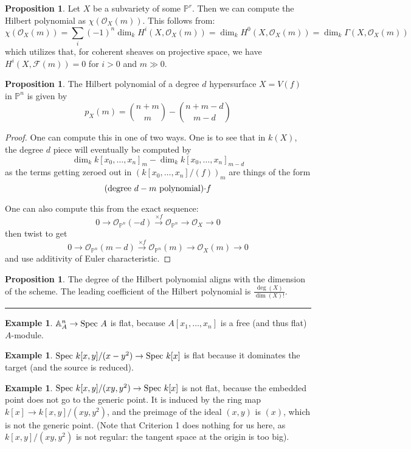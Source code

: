 \documentclass[10pt,reqno]{amsart}
\theoremstyle{definition}
\newtheorem{example}[theorem]{Example}
\newtheorem{proposition}[theorem]{Proposition}
\theoremstyle{remark}
\numberwithin{equation}{section}
\numberwithin{theorem}{section}
\newcommand{\OO}{{\mathcal O}}
\newcommand{\spec}{\textup{Spec }}
\newcommand{\FF}{{\mathscr F}}
\newcommand{\A}{{\mathbb A}}
\newcommand{\PP}{{\mathbb P}}
\begin{document}
\begin{proposition} Let $X$ be a subvariety of some $\PP^r$. Then we can compute the Hilbert polynomial as $\chi(\OO_X(m))$. This follows from:
\[\chi(\OO_X(m)) = \sum_{i} (-1)^n \dim_k H^i(X,\OO_X(m)) = \dim_k H^0(X,\OO_X(m)) = \dim_k \Gamma(X,\OO_X(m))\]
which utilizes that, for coherent sheaves on projective space, we have $H^i(X,\FF(m)) = 0$ for $i > 0$ and $m \gg 0$.
\end{proposition}

\begin{proposition} The Hilbert polynomial of a degree $d$ hypersurface $X = V(f)$ in $\PP^n$ is given by
\[p_X(m) = \binom{n+m}{m} - \binom{n+m-d}{m-d}\]
\end{proposition}
\begin{proof}
One can compute this in one of two ways. One is to see that in $k(X)$, the degree $d$ piece will eventually be computed by 
\[\dim_k k[x_0,\dots,x_n]_m - \dim_k k[x_0,\dots,x_n]_{m-d}\]
as the terms getting zeroed out in $(k[x_0,\dots,x_n]/(f))_m$ are things of the form 
\[\textup{(degree $d-m$ polynomial)$\cdot f$}\]

One can also compute this from the exact sequence:
\[0 \to \OO_{\PP^n}(-d) \stackrel{\times f}{\to} \OO_{\PP^n} \to \OO_X \to 0\]
then twist to get 
\[0 \to \OO_{\PP^n}(m-d) \stackrel{\times f}{\to} \OO_{\PP^n}(m) \to \OO_X(m) \to 0\]
and use additivity of Euler characteristic.
\end{proof}

\begin{proposition} The degree of the Hilbert polynomial aligns with the dimension of the scheme. The leading coefficient of the Hilbert polynomial is $\frac{\deg(X)}{\dim(X)!}$.
\end{proposition}

\hrule
\vspace{1em}

\begin{example} $\A^n_{A} \to \spec A$ is flat, because $A[x_1,\dots,x_n]$ is a free (and thus flat) $A$-module.
\end{example}

\begin{example} $\spec k[x,y]/(x-y^2) \to \spec k[x]$ is flat because it dominates the target (and the source is reduced).
\end{example}

\begin{example} $\spec k[x,y]/(xy,y^2) \to \spec k[x]$ is not flat, because the embedded point does not go to the generic point. It is induced by the ring map $k[x] \to k[x,y]/(xy,y^2)$, and the preimage of the ideal $(x,y)$ is $(x)$, which is not the generic point. (Note that Criterion 1 does nothing for us here, as $k[x,y]/(xy,y^2)$ is not regular: the tangent space at the origin is too big).
\end{example}
\end{document}
